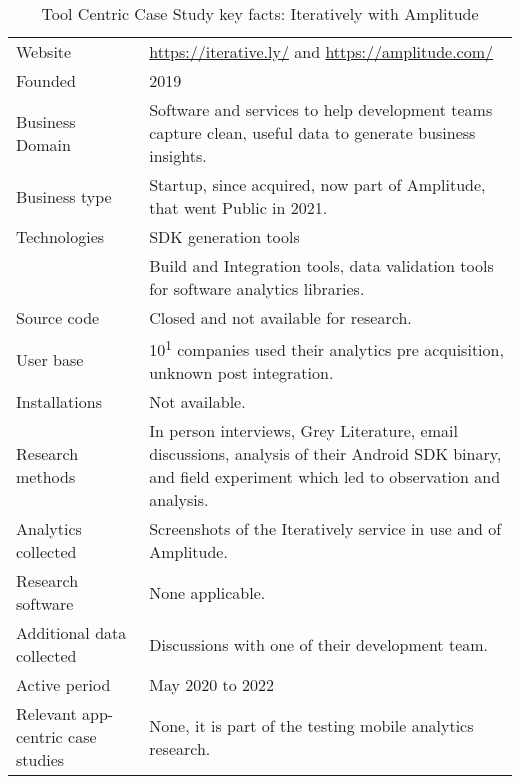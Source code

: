 {\renewcommand{\arraystretch}{0.8}%
\begin{table*}
    \centering
    \small
    \setlength{\tabcolsep}{6pt}
    \begin{tabular}{lp{9cm}}
       \toprule
       Website &\url{https://iterative.ly/} and \url{https://amplitude.com/} \\
       Founded & 2019 \\ %
       Business Domain & Software and services to help development teams capture clean, useful data to generate business insights. \\ %
       Business type & Startup, since acquired, now part of Amplitude, that went Public in 2021. \\
       Technologies  & SDK generation tools \\
       & Build and Integration tools, data validation tools for software analytics libraries. \\
       Source code  &Closed and not available for research. \\
       \midrule
       User base & 10\textsuperscript{1} companies used their analytics pre acquisition, unknown post integration. \\
       Installations & Not available.  \\
       \midrule
       Research methods &In person interviews, Grey Literature, email discussions, analysis of their Android SDK binary, and field experiment which led to observation and analysis. \\
       Analytics collected & Screenshots of the Iteratively service in use and of Amplitude. \\
       Research software & None applicable. \\
       Additional data collected &Discussions with one of their development team. \\
       Active period & May 2020 to 2022 \\
       Relevant app-centric case studies & None, it is part of the testing mobile analytics research. \\
       \bottomrule
    \end{tabular}
    \caption{Tool Centric Case Study key facts: Iteratively with Amplitude}
    \label{tab:iteratively_with_amplitude_anaytics_overview}
\end{table*}
}

